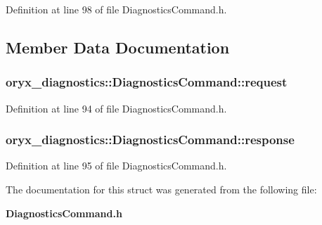 \-Definition at line 98 of file \-Diagnostics\-Command.\-h.



\subsection{\-Member \-Data \-Documentation}
\subsubsection[{request}]{ {\bf oryx\-\_\-diagnostics\-::\-Diagnostics\-Command\-::request}}\label{structoryx__diagnostics_1_1DiagnosticsCommand_a42a11d97997f52ccf33fd3b3ebe50b7e}


\-Definition at line 94 of file \-Diagnostics\-Command.\-h.

\subsubsection[{response}]{ {\bf oryx\-\_\-diagnostics\-::\-Diagnostics\-Command\-::response}}\label{structoryx__diagnostics_1_1DiagnosticsCommand_a7d5f6e55c9bc1fce857e073289fbcb75}


\-Definition at line 95 of file \-Diagnostics\-Command.\-h.



\-The documentation for this struct was generated from the following file\-:\begin{DoxyCompactItemize}
\item 
{\bf \-Diagnostics\-Command.\-h}\end{DoxyCompactItemize}
